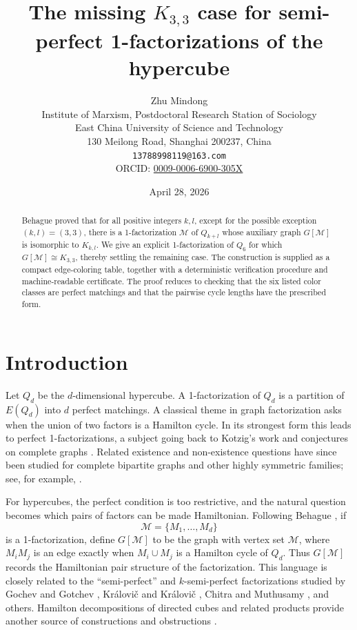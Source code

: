 \documentclass[11pt]{article}
\title{The missing \texorpdfstring{\(K_{3,3}\)}{K3,3} case for semi-perfect 1-factorizations of the hypercube}
\author{Zhu Mindong\\
Institute of Marxism, Postdoctoral Research Station of Sociology\\
East China University of Science and Technology\\
130 Meilong Road, Shanghai 200237, China\\
\texttt{13788998119@163.com}\\
ORCID: \href{https://orcid.org/0009-0006-6900-305X}{0009-0006-6900-305X}}
\date{April 28, 2026}
\newcommand{\M}{\mathcal M}
\begin{document}
\maketitle

\begin{abstract}
Behague proved that for all positive integers \(k,l\), except for the possible
exception \((k,l)=(3,3)\), there is a 1-factorization \(\M\) of \(Q_{k+l}\)
whose auxiliary graph \(G[\M]\) is isomorphic to \(K_{k,l}\).  We give an
explicit 1-factorization of \(Q_6\) for which \(G[\M]\cong K_{3,3}\), thereby
settling the remaining case.  The construction is supplied as a compact
edge-coloring table, together with a deterministic verification procedure and
machine-readable certificate.  The proof reduces to checking that the six
listed color classes are perfect matchings and that the pairwise cycle lengths
have the prescribed form.
\end{abstract}

\section{Introduction}

Let \(Q_d\) be the \(d\)-dimensional hypercube.  A 1-factorization of \(Q_d\)
is a partition of \(E(Q_d)\) into \(d\) perfect matchings.  A classical theme
in graph factorization asks when the union of two factors is a Hamilton cycle.
In its strongest form this leads to perfect 1-factorizations, a subject going
back to Kotzig's work and conjectures on complete graphs
\cite{kotzig,anderson}.  Related existence and non-existence questions have
since been studied for complete bipartite graphs and other highly symmetric
families; see, for example, \cite{laufer,bryant_maenhaut_wanless}.

For hypercubes, the perfect condition is too restrictive, and the natural
question becomes which pairs of factors can be made Hamiltonian.  Following
Behague \cite{behague}, if
\[
  \M=\{M_1,\dots,M_d\}
\]
is a 1-factorization, define \(G[\M]\) to be the graph with vertex set
\(\M\), where \(M_iM_j\) is an edge exactly when \(M_i\cup M_j\) is a
Hamilton cycle of \(Q_d\).  Thus \(G[\M]\) records the Hamiltonian pair
structure of the factorization.  This language is closely related to the
``semi-perfect'' and \(k\)-semi-perfect factorizations studied by Gochev and
Gotchev \cite{gochev_gotchev}, Kr\'alovi\v{c} and Kr\'alovi\v{c}
\cite{kralovic_kralovic}, Chitra and Muthusamy \cite{chitra_muthusamy}, and
others.  Hamilton decompositions of directed cubes and related products
provide another source of constructions and obstructions \cite{stong}.
\end{document}
